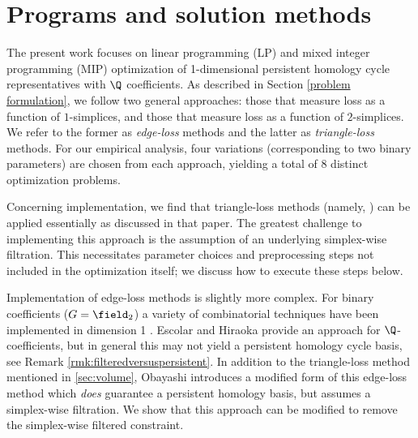 \section{Programs and solution methods}\label{methodsProblems}
\label{sec:programsandmethods}

The present work focuses on linear  programming (LP) and mixed integer programming (MIP) optimization of 1-dimensional persistent homology cycle representatives with $\Q$ coefficients. As described in Section \ref{problem formulation}, we follow two general approaches: those that measure loss as a function of $1$-simplices, and those that measure loss as a function of $2$-simplices.  We refer to the former as \emph{edge-loss} methods and the latter as \emph{triangle-loss} methods.  
For our empirical analysis, four variations (corresponding to two binary parameters) are chosen from each approach, yielding a total of 8 distinct optimization problems. %

Concerning implementation, we find that triangle-loss methods (namely, \cite{Obayashi2018}) can be applied essentially as discussed in that paper.  The greatest challenge to implementing this approach is the assumption of an underlying simplex-wise filtration. This necessitates parameter choices and preprocessing steps not included in the optimization itself; we discuss how to execute these steps below.  


Implementation of edge-loss methods is slightly more complex.  For binary coefficients ($G = \field_2$) a variety of combinatorial techniques have been implemented in dimension 1 \cite{chenquantifying, zhang2019heuristic}.  Escolar and Hiraoka \cite{Escolar2016} provide an approach for $\Q$-coefficients, but in general this may not yield a persistent homology cycle basis, see Remark \ref{rmk:filteredversuspersistent}.  %
In addition to the triangle-loss method mentioned in \se \ref{sec:volume}, Obayashi \cite{Obayashi2018} introduces a modified form of this edge-loss method which \emph{does} guarantee a persistent homology basis, but assumes a simplex-wise filtration.  We show that this approach can be modified to remove the simplex-wise filtered constraint.

